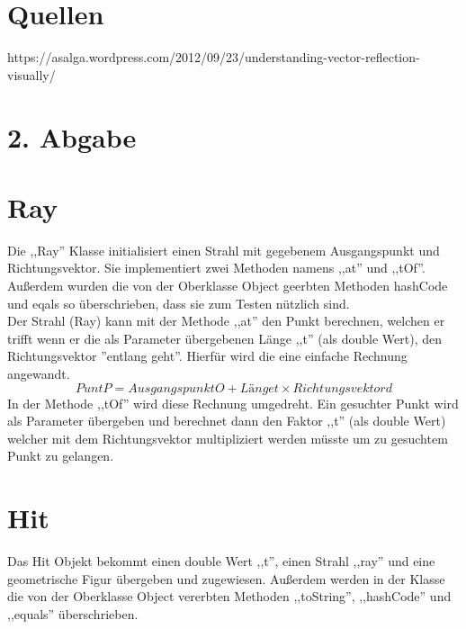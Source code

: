 \documentclass[14pt]{extarticle}
\begin{document}
\section{Quellen}
https://asalga.wordpress.com/2012/09/23/understanding-vector-reflection-visually/

\section*{2. Abgabe}

\section{Ray}
Die ,,Ray'' Klasse initialisiert einen Strahl mit gegebenem Ausgangspunkt und Richtungsvektor. Sie implementiert zwei Methoden namens ,,at'' und ,,tOf''. Außerdem wurden die von der Oberklasse Object geerbten Methoden hashCode und eqals so überschrieben, dass sie zum Testen nützlich sind.\\
Der Strahl (Ray) kann mit der Methode ,,at'' den Punkt berechnen, welchen er trifft wenn er die als Parameter übergebenen Länge ,,t'' (als double Wert), den Richtungsvektor ''entlang geht''. Hierfür wird die eine einfache Rechnung angewandt. 
$$ Punt P = Ausgangspunkt O + Länge t \times Richtungsvektor d $$
In der Methode ,,tOf'' wird diese Rechnung umgedreht. Ein gesuchter Punkt wird als Parameter übergeben und berechnet dann den Faktor ,,t'' (als double Wert) welcher mit dem Richtungsvektor multipliziert werden müsste um zu gesuchtem Punkt zu gelangen. \\

\section{Hit}
Das Hit Objekt bekommt einen double Wert ,,t'', einen Strahl ,,ray'' und eine geometrische Figur übergeben und zugewiesen. Außerdem werden in der Klasse die von der Oberklasse Object vererbten Methoden ,,toString'', ,,hashCode'' und ,,equals'' überschrieben.
\end{document}
